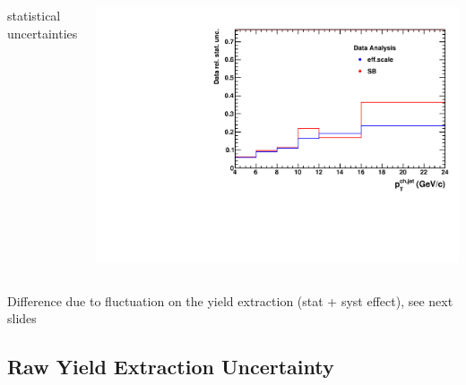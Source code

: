 \documentclass[xcolor={usenames,dvipsnames}]{beamer}
\begin{document}
\begin{frame}
\begin{columns}[c]
\column{5.5cm} 
\footnotesize{statistical uncertainties}
\begin{minipage}{1.\linewidth}
\includegraphics[width=0.95\linewidth]{img/rawYieldpPb/DataStatUnc.pdf}
\end{minipage}
	
\end{columns}

Difference due to fluctuation on the yield extraction (stat + syst effect), see next slides

\end{frame}

\subsection{Raw Yield Extraction Uncertainty}
\end{document}
